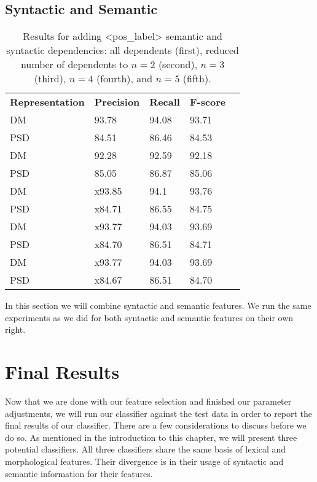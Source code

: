 \subsection{Syntactic and Semantic}
\label{results_syn_sem}

\begin{table}
    \centering
    \smaller[0.2]
    \begin{tabular}{@{}lllll@{}}
        \toprule
        \textbf{Representation} & \textbf{Precision} & \textbf{Recall} & \textbf{F-score} \\
        DM &  93.78 & 94.08 & 93.71 \\
        PSD & 84.51 & 86.46 & 84.53 \\
        \midrule
        DM &  92.28 & 92.59& 92.18 \\
        PSD & 85.05 & 86.87 & 85.06 \\
        \midrule
        DM &  x93.85 & 94.1 & 93.76 \\
        PSD & x84.71 & 86.55 & 84.75 \\
        \midrule
        DM &  x93.77 & 94.03 & 93.69 \\
        PSD & x84.70 & 86.51 & 84.71 \\
        \midrule
        DM &  x93.77 & 94.03 & 93.69 \\
        PSD & x84.67 & 86.51 & 84.70 \\
        \bottomrule
    \end{tabular}
    \caption{Results for adding <pos\_label> semantic and syntactic dependencies: all dependents (first), reduced number of dependents to $n=2$ (second), $n=3$ (third), $n=4$ (fourth), and $n=5$ (fifth).}
    \label{table:semantic_dependents_n}
\end{table}

In this section we will combine syntactic and semantic features. We run the same experiments as we did for both syntactic and semantic features on their own right.


\section{Final Results}
\label{results_final}

Now that we are done with our feature selection and finished our parameter adjustments, we will run our classifier against the test data in order to report the final results of our classifier. There are a few considerations to discuss before we do so. As mentioned in the introduction to this chapter, we will present three potential classifiers. All three classifiers share the same basis of lexical and morphological features. Their divergence is in their usage of syntactic and semantic information for their features. 

